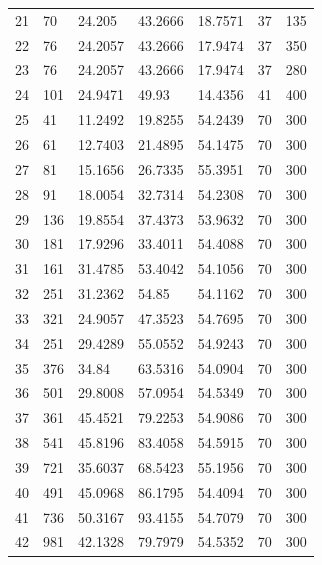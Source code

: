 \documentclass[11pt]{article}
\begin{document}
\begin{table}[htbp]
{\begin{tabular}{lllllll}
21      & 70  & 24.205    & 43.2666  & 18.7571     & 37         & 135  \\
22      & 76  & 24.2057   & 43.2666  & 17.9474     & 37         & 350  \\
23      & 76  & 24.2057   & 43.2666  & 17.9474     & 37         & 280  \\
24      & 101 & 24.9471   & 49.93    & 14.4356     & 41         & 400  \\
25      & 41  & 11.2492   & 19.8255  & 54.2439     & 70         & 300  \\
26      & 61  & 12.7403   & 21.4895  & 54.1475     & 70         & 300  \\
27      & 81  & 15.1656   & 26.7335  & 55.3951     & 70         & 300  \\
28      & 91  & 18.0054   & 32.7314  & 54.2308     & 70         & 300  \\
29      & 136 & 19.8554   & 37.4373  & 53.9632     & 70         & 300  \\
30      & 181 & 17.9296   & 33.4011  & 54.4088     & 70         & 300  \\
31      & 161 & 31.4785   & 53.4042  & 54.1056     & 70         & 300  \\
32      & 251 & 31.2362   & 54.85    & 54.1162     & 70         & 300  \\
33      & 321 & 24.9057   & 47.3523  & 54.7695     & 70         & 300  \\
34      & 251 & 29.4289   & 55.0552  & 54.9243     & 70         & 300  \\
35      & 376 & 34.84     & 63.5316  & 54.0904     & 70         & 300  \\
36      & 501 & 29.8008   & 57.0954  & 54.5349     & 70         & 300  \\
37      & 361 & 45.4521   & 79.2253  & 54.9086     & 70         & 300  \\
38      & 541 & 45.8196   & 83.4058  & 54.5915     & 70         & 300  \\
39      & 721 & 35.6037   & 68.5423  & 55.1956     & 70         & 300  \\
40      & 491 & 45.0968   & 86.1795  & 54.4094     & 70         & 300  \\
41      & 736 & 50.3167   & 93.4155  & 54.7079     & 70         & 300  \\
42      & 981 & 42.1328   & 79.7979  & 54.5352     & 70         & 300  \\
\hline
\end{tabular}
}
\end{table}
\end{document}
